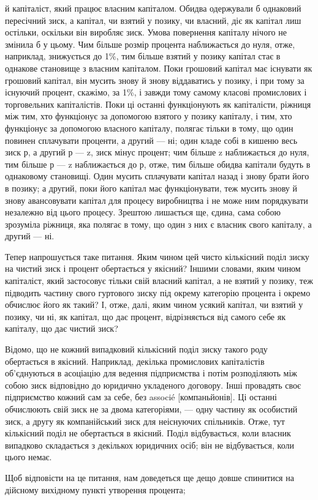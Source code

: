 \parcont{}  %
й капіталіст, який працює власним капіталом. Обидва одержували
б однаковий пересічний зиск, а капітал, чи взятий у позику,
чи власний, діє як капітал лиш остільки, оскільки він
виробляє зиск. Умова повернення капіталу нічого не змінила б
у цьому. Чим більше розмір процента наближається до нуля,
отже, наприклад, знижується до 1\%, тим більше взятий у позику
капітал стає в однакове становище з власним капіталом.
Поки грошовий капітал має існувати як грошовий капітал,
він мусить знову й знову віддаватись у позику, і при тому
за існуючий процент, скажімо, за 1\%, і завжди тому самому
класові промислових і торговельних капіталістів. Поки ці останні
функціонують як капіталісти, ріжниця між тим, хто функціонує
за допомогою взятого у позику капіталу, і тим, хто функціонує за
допомогою власного капіталу, полягає тільки в тому, що один
повинен сплачувати проценти, а другий — ні; один кладе собі в
кишеню весь зиск р, а другий р — z, зиск мінус процент; чим
більше z наближається до нуля, тим більше р — z наближається
до р, отже, тим більше обидва капітали будуть в однаковому
становищі. Один мусить сплачувати капітал назад і знову брати
його в позику; а другий, поки його капітал має функціонувати,
теж мусить знову й знову авансовувати капітал для процесу
виробництва і не може ним порядкувати незалежно від цього
процесу. Зрештою лишається ще, єдина, сама собою зрозуміла
ріжниця, яка полягає в тому, що один з них є власник свого капіталу,
а другий — ні.

Тепер напрошується таке питання. Яким чином цей чисто
кількісний поділ зиску на чистий зиск і процент обертається
у якісний? Іншими словами, яким чином капіталіст, який застосовує
тільки свій власний капітал, а не взятий у позику, теж
підводить частину свого гуртового зиску під окрему категорію
процента і окремо обчислює його як такий? І, отже, далі, яким
чином усякий капітал, чи взятий у позику, чи ні, як капітал,
що дає процент, відрізняється від самого себе як капіталу, що
дає чистий зиск?

Відомо, що не кожний випадковий кількісний поділ зиску
такого роду обертається в якісний. Наприклад, декілька промислових
капіталістів об’єднуються в асоціацію для ведення підприємства
і потім розподіляють між собою зиск відповідно до
юридично укладеного договору. Інші провадять своє підприємство
кожний сам за себе, без associé [компаньйонів]. Ці останні
обчислюють свій зиск не за двома категоріями, — одну частину
як особистий зиск, а другу як компанійський зиск для неіснуючих
спільників. Отже, тут кількісний поділ не обертається
в якісний. Поділ відбувається, коли власник випадково складається
з декількох юридичних осіб; він не відбувається, коли
цього немає.

Щоб відповісти на це питання, нам доведеться ще дещо довше
спинитися на дійсному вихідному пункті утворення процента;
\parbreak{}  %
